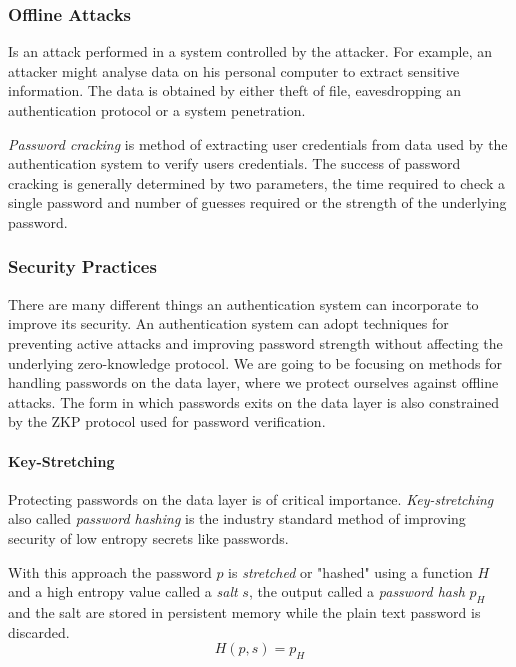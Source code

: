 \subsubsection{Offline Attacks}
Is an attack performed in a system controlled by the attacker.
For example, an attacker might analyse data on his personal computer to extract sensitive information.
The data is obtained by either theft of file, eavesdropping an authentication protocol or a system penetration.

\textit{Password cracking} \cite{blocki2018economics} is method of extracting user credentials from data used by the authentication system to verify users credentials.
The success of password cracking is generally determined by two parameters, the time required to check a single password and number of guesses required or the strength of the underlying password.

\subsubsection{Security Practices}
\label{password-security-practices}
There are many different things an authentication system can incorporate to improve its security.
An authentication system can adopt techniques for preventing active attacks and improving password strength without affecting the underlying zero-knowledge  protocol.
We are going to be focusing on methods for handling passwords on the data layer, where we protect ourselves against offline attacks.
The form in which passwords exits on the data layer is also constrained by the ZKP protocol used for password verification.

\paragraph{Key-Stretching}
\label{paragraph:password-hashing}
Protecting passwords on the data layer is of critical importance.
\textit{Key-stretching} \cite{hornby2016salted} also called \textit{password hashing} is the industry standard method of improving security of low entropy secrets like passwords.

With this approach the password $p$ is \textit{stretched} or "hashed" using a function $H$ and a high entropy value called a \textit{salt} $s$, the output called a \textit{password hash} $p_H$ and the salt are stored in persistent memory while the plain text password is discarded.
$$H(p, s) = p_H$$

